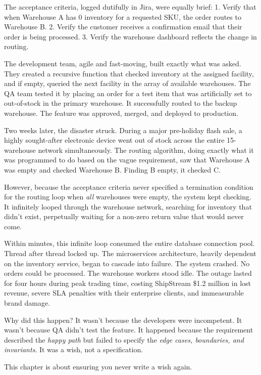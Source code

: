 \documentclass[
  11pt,
  openany,
  oneside]{book}
\begin{document}
The acceptance criteria, logged dutifully in Jira, were equally brief:
1. Verify that when Warehouse A has 0 inventory for a requested SKU, the
order routes to Warehouse B. 2. Verify the customer receives a
confirmation email that their order is being processed. 3. Verify the
warehouse dashboard reflects the change in routing.

The development team, agile and fast-moving, built exactly what was
asked. They created a recursive function that checked inventory at the
assigned facility, and if empty, queried the next facility in the array
of available warehouses. The QA team tested it by placing an order for a
test item that was artificially set to out-of-stock in the primary
warehouse. It successfully routed to the backup warehouse. The feature
was approved, merged, and deployed to production.

Two weeks later, the disaster struck. During a major pre-holiday flash
sale, a highly sought-after electronic device went out of stock across
the entire 15-warehouse network simultaneously. The routing algorithm,
doing exactly what it was programmed to do based on the vague
requirement, saw that Warehouse A was empty and checked Warehouse B.
Finding B empty, it checked C.

However, because the acceptance criteria never specified a termination
condition for the routing loop when \emph{all} warehouses were empty,
the system kept checking. It infinitely looped through the warehouse
network, searching for inventory that didn't exist, perpetually waiting
for a non-zero return value that would never come.

Within minutes, this infinite loop consumed the entire database
connection pool. Thread after thread locked up. The microservices
architecture, heavily dependent on the inventory service, began to
cascade into failure. The system crashed. No orders could be processed.
The warehouse workers stood idle. The outage lasted for four hours
during peak trading time, costing ShipStream \$1.2 million in lost
revenue, severe SLA penalties with their enterprise clients, and
immeasurable brand damage.

Why did this happen? It wasn't because the developers were incompetent.
It wasn't because QA didn't test the feature. It happened because the
requirement described the \emph{happy path} but failed to specify the
\emph{edge cases, boundaries, and invariants}. It was a wish, not a
specification.

This chapter is about ensuring you never write a wish again.
\end{document}
